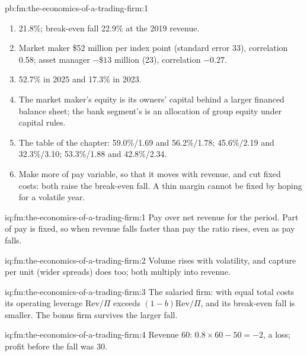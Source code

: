 \begin{solution}{pb:fm:the-economics-of-a-trading-firm:1}
\begin{enumerate}
\item 21.8\%; break-even fall 22.9\% at the 2019 revenue.
\item Market maker \$52 million per index point (standard error 33), correlation 0.58; asset manager $-\$13$ million (23), correlation $-0.27$.
\item 52.7\% in 2025 and 17.3\% in 2023.
\item The market maker's equity is its owners' capital behind a larger financed balance sheet; the bank segment's is an allocation of group equity
under capital rules.
\item The table of the chapter: 59.0\%/1.69 and 56.2\%/1.78; 45.6\%/2.19 and 32.3\%/3.10; 53.3\%/1.88 and 42.8\%/2.34.
\item Make more of pay variable, so that it moves with revenue, and cut fixed costs: both raise the break-even fall. A thin margin cannot be fixed
by hoping for a volatile year.
\end{enumerate}
\end{solution}

\begin{solution}{iq:fm:the-economics-of-a-trading-firm:1}
Pay over net revenue for the period. Part of pay is fixed, so when revenue falls faster than pay the ratio rises, even as pay falls.
\end{solution}

\begin{solution}{iq:fm:the-economics-of-a-trading-firm:2}
Volume rises with volatility, and capture per unit (wider spreads) does too; both multiply into revenue.
\end{solution}

\begin{solution}{iq:fm:the-economics-of-a-trading-firm:3}
The salaried firm: with equal total costs its operating leverage $\mathrm{Rev}/\Pi$ exceeds $(1-b)\mathrm{Rev}/\Pi$, and its break-even fall is
smaller. The bonus firm survives the larger fall.
\end{solution}

\begin{solution}{iq:fm:the-economics-of-a-trading-firm:4}
Revenue 60: $0.8\times60-50=-2$, a loss; profit before the fall was 30.
\end{solution}

